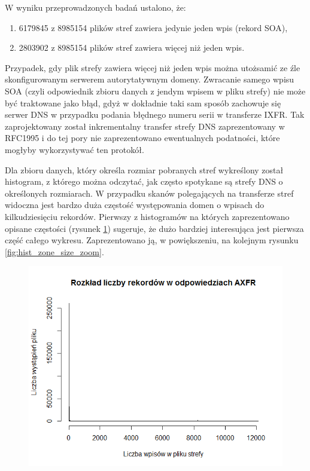 W wyniku przeprowadzonych badań ustalono, że:
\begin{enumerate}
	\item 6179845 z 8985154 plików stref zawiera jedynie jeden wpis (rekord SOA),
	\item 2803902 z 8985154 plików stref zawiera więcej niż jeden wpis.
\end{enumerate}
Przypadek, gdy plik strefy zawiera więcej niż jeden wpis można utożsamić ze źle skonfigurowanym serwerem autorytatywnym domeny. Zwracanie samego wpisu SOA (czyli odpowiednik zbioru danych z jendym wpisem w pliku strefy) nie może być traktowane jako błąd, gdyż w dokładnie taki sam sposób zachowuje się serwer DNS w przypadku podania błędnego numeru serii w transferze IXFR. Tak zaprojektowany został inkrementalny transfer strefy DNS zaprezentowany w RFC1995\cite{RFC1995} i do tej pory nie zaprezentowano ewentualnych podatności, które mogłyby wykorzystywać ten protokół.

Dla zbioru danych, który określa rozmiar pobranych stref wykreślony został histogram, z którego można odczytać, jak często spotykane są strefy DNS o określonych rozmiarach. W przypadku skanów polegających na transferze stref widoczna jest bardzo duża częstość występowania domen o wpisach do kilkudziesięciu rekordów. Pierwszy z histogramów na których zaprezentowano opisane częstości (rysunek \ref{fig:hist_zone_size}) sugeruje, że dużo bardziej interesująca jest pierwsza część całego wykresu. Zaprezentowano ją, w powiększeniu, na kolejnym rysunku \ref{fig:hist_zone_size_zoom}.

\begin{figure}[ht]
	\centering
	\includegraphics[width=1.0\textwidth]{image/hist_zone_size}
	\caption{}
	\label{fig:hist_zone_size}
\end{figure}

